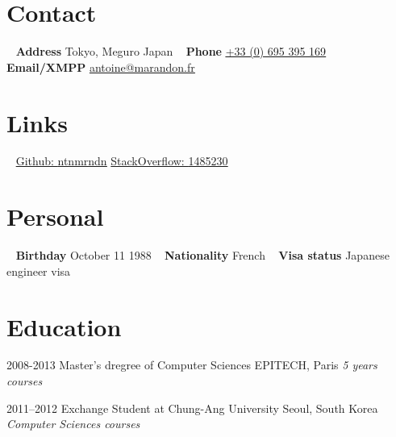 \documentclass[]{template/friggeri-cv} %
\begin{document}


\begin{aside} %
\section{Contact}
~
\textbf{Address}
Tokyo, Meguro
Japan
~
\textbf{Phone}
\href{tel:0033695395169}{\underline{+33 (0) 695 395 169}}
~
\textbf{Email/XMPP}
\href{mailto:antoine@marandon.fr}{\underline{antoine@marandon.fr}}
\section {Links}
~
\href{https://github.com/ntnmrndn}{Github: \underline{ntnmrndn}}
\href{http://stackoverflow.com/users/1485230/}{StackOverflow: \underline{1485230}}
\section{Personal}
~
\textbf{Birthday}
October 11 1988
~
\textbf{Nationality}
French
~
\textbf{Visa status}
Japanese engineer visa
\end{aside}


\section{Education}

\begin{entrylist}


\entry
{2008-2013}
{Master's dregree {\normalfont of Computer Sciences}}
{EPITECH, Paris}
{\emph{5 years courses}}


\entry
{2011--2012}
{Exchange Student {\normalfont at Chung-Ang University}}
{Seoul, South Korea}
{\emph{Computer Sciences courses}}


\end{entrylist}
\end{document}
